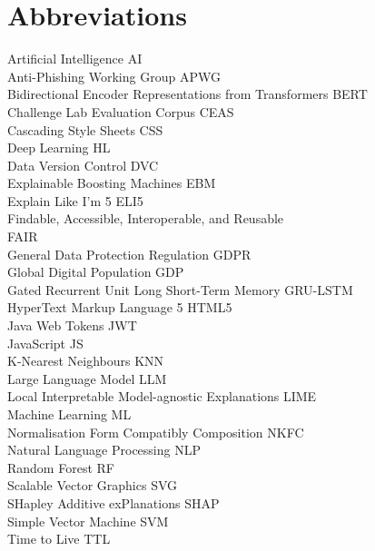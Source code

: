
\section*{Abbreviations}

\large
Artificial Intelligence \hfill AI\\
Anti-Phishing Working Group \hfill APWG\\
Bidirectional Encoder Representations from Transformers \hfill BERT\\
Challenge Lab Evaluation Corpus \hfill CEAS\\
Cascading Style Sheets \hfill CSS\\
Deep Learning \hfill HL\\
Data Version Control \hfill DVC\\
Explainable Boosting Machines \hfill EBM\\
Explain Like I'm 5 \hfill ELI5 \\
Findable, Accessible, Interoperable, and Reusable \hfill \\ FAIR \\
General Data Protection Regulation \hfill GDPR\\
Global Digital Population \hfill GDP\\
Gated Recurrent Unit Long Short-Term Memory \hfill GRU-LSTM\\
HyperText Markup Language 5 \hfill HTML5\\
Java Web Tokens \hfill JWT\\
JavaScript \hfill JS\\
K-Nearest Neighbours \hfill KNN\\
Large Language Model \hfill LLM\\
Local Interpretable Model-agnostic Explanations \hfill LIME\\
Machine Learning \hfill ML\\
Normalisation Form Compatibly Composition \hfill NKFC\\
Natural Language Processing \hfill NLP \\
Random Forest \hfill RF \\
Scalable Vector Graphics \hfill SVG\\
SHapley Additive exPlanations \hfill SHAP\\
Simple Vector Machine \hfill SVM\\
Time to Live \hfill TTL\\

